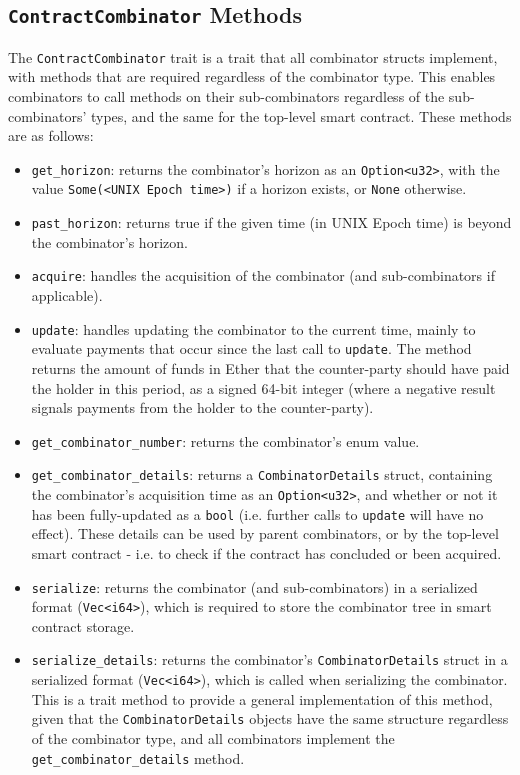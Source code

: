 \subsection{\texttt{ContractCombinator} Methods} \label{contract-combinator-trait}

The \texttt{ContractCombinator} trait is a trait that all combinator structs implement, with methods that are required regardless of the combinator type. This enables combinators to call methods on their sub-combinators regardless of the sub-combinators' types, and the same for the top-level smart contract. These methods are as follows: \\

\begin{itemize}
    \item \texttt{get\_horizon}: returns the combinator's horizon as an \texttt{Option<u32>}, with the value \texttt{Some(<U\-NIX Epoch time>)} if a horizon exists, or \texttt{None} otherwise.
    \item \texttt{past\_horizon}: returns true if the given time (in UNIX Epoch time) is beyond the combinator's horizon.
    \item \texttt{acquire}: handles the acquisition of the combinator (and sub-combinators if applicable).
    \item \texttt{update}: handles updating the combinator to the current time, mainly to evaluate payments that occur since the last call to \texttt{update}. The method returns the amount of funds in Ether that the counter-party should have paid the holder in this period, as a signed 64-bit integer (where a negative result signals payments from the holder to the counter-party).
    \item \texttt{get\_combinator\_number}: returns the combinator's enum value.
    \item \texttt{get\_combinator\_details}: returns a \texttt{CombinatorDetails} struct, containing the combinator's acquisition time as an \texttt{Option<u32>}, and whether or not it has been fully-updated as a \texttt{bool} (i.e. further calls to \texttt{update} will have no effect). These details can be used by parent combinators, or by the top-level smart contract - i.e. to check if the contract has concluded or been acquired.
    \item \texttt{serialize}: returns the combinator (and sub-combinators) in a serialized format (\texttt{Vec<i64>}), which is required to store the combinator tree in smart contract storage.
    \item \texttt{serialize\_details}: returns the combinator's \texttt{CombinatorDetails} struct in a serialized format (\texttt{Vec<i64>}), which is called when serializing the combinator. This is a trait method to provide a general implementation of this method, given that the \texttt{CombinatorDetails} objects have the same structure regardless of the combinator type, and all combinators implement the \texttt{get\_combinator\_details} method. \\
\end{itemize}

